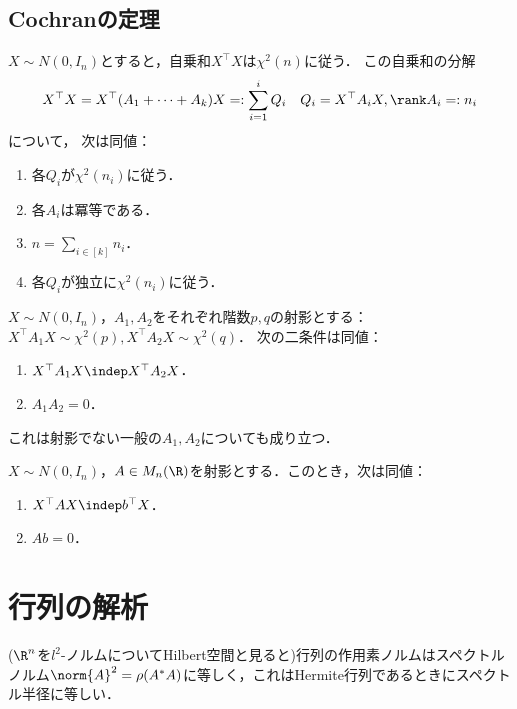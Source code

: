 \documentclass[uplatex, dvipdfmx]{jsreport}
\begin{document}
\subsection{Cochranの定理}

\begin{theorem}[Cochran]
    $X\sim N(0,I_n)$とすると，自乗和$X^\top X$は$\chi^2(n)$に従う．
    この自乗和の分解\[X^\top X=X^\top(A_1+\cdots+A_k)X=:\sum_{i=1}^iQ_i\quad Q_i=X^\top A_iX,\rank A_i=:n_i\]について，
    次は同値：
    \begin{enumerate}
        \item 各$Q_i$が$\chi^2(n_i)$に従う．
        \item 各$A_i$は冪等である．
        \item $n=\sum_{i\in[k]}n_i$．
        \item 各$Q_i$が独立に$\chi^2(n_i)$に従う．
    \end{enumerate}
\end{theorem}

\begin{proposition}
    $X\sim N(0,I_n)$，$A_1,A_2$をそれぞれ階数$p,q$の射影とする：$X^\top A_1X\sim\chi^2(p),X^\top A_2X\sim\chi^2(q)$．
    次の二条件は同値：
    \begin{enumerate}
        \item $X^\top A_1X\indep X^\top A_2X$．
        \item $A_1A_2=0$．
    \end{enumerate}
    これは射影でない一般の$A_1,A_2$についても成り立つ．
\end{proposition}

\begin{proposition}
    $X\sim N(0,I_n)$，$A\in M_n(\R)$を射影とする．このとき，次は同値：
    \begin{enumerate}
        \item $X^\top AX\indep b^\top X$．
        \item $Ab=0$．
    \end{enumerate}
\end{proposition}

\section{行列の解析}

\begin{tcolorbox}[colframe=ForestGreen, colback=ForestGreen!10!white,breakable,colbacktitle=ForestGreen!40!white,coltitle=black,fonttitle=\bfseries\sffamily,
title=]
    ($\R^n$を$l^2$-ノルムについてHilbert空間と見ると)行列の作用素ノルムはスペクトルノルム$\norm{A}^2=\rho(A^*A)$に等しく，これはHermite行列であるときにスペクトル半径に等しい．
\end{tcolorbox}
\end{document}
